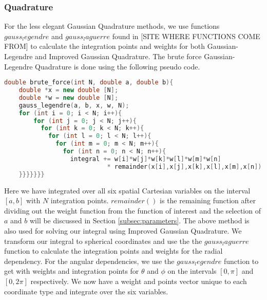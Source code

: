 \documentclass{emulateapj}
\begin{document}
\subsubsection{Quadrature}
For the less elegant Gaussian Quadrature methods, we use functions $gauss_legendre$ and $gauss_laguerre$ found in [SITE WHERE FUNCTIONS COME FROM] to calculate the integration points and weights for both Gaussian-Legendre and Improved Gaussian Quadrature. The brute force Gaussian-Legendre Quadrature is done using the following pseudo code.
\begin{lstlisting}[language=c++]
double brute_force(int N, double a, double b){
    double *x = new double [N];
    double *w = new double [N];
    gauss_legendre(a, b, x, w, N);
    for (int i = 0; i < N; i++){
        for (int j = 0; j < N; j++){
          for (int k = 0; k < N; k++){
            for (int l = 0; l < N; l++){
              for (int m = 0; m < N; m++){
                for (int n = 0; n < N; n++){
                  integral += w[i]*w[j]*w[k]*w[l]*w[m]*w[n]
                            * remainder(x[i],x[j],x[k],x[l],x[m],x[n]);
    }}}}}}}
\end{lstlisting}
Here we have integrated over all six spatial Cartesian variables on the interval $[a,b]$ with $N$ integration points. $remainder()$ is the remaining function after dividing out the weight function from the function of interest and the selection of $a$ and $b$ will be discussed in Section \ref{subsec:parameters}. The above method is also used for solving our integral using Improved Gaussian Quadrature. We transform our integral to spherical coordinates and use the  the $gauss_laguerre$ function to calculate the integration points and weights for the radial dependency. For the angular dependencies, we use the $gauss_legendre$ function to get with weights and integration points for $\theta$ and $\phi$ on the intervals $[0,\pi]$ and $[0,2\pi]$ respectively. We now have a weight and points vector unique to each coordinate type and integrate over the six variables.
\end{document}
